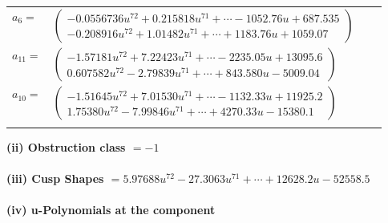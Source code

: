 \documentclass[1p]{elsarticle_modified}
\theoremstyle{definition}
\begin{document}
\begin{tabular}{m{7pt} m{180pt} m{7pt} m{180pt} }
\flushright $a_{6}=$&$\begin{pmatrix}-0.0556736 u^{72}+0.215818 u^{71}+\cdots-1052.76 u+687.535\\-0.208916 u^{72}+1.01482 u^{71}+\cdots+1183.76 u+1059.07\end{pmatrix}$ \\
\flushright $a_{11}=$&$\begin{pmatrix}-1.57181 u^{72}+7.22423 u^{71}+\cdots-2235.05 u+13095.6\\0.607582 u^{72}-2.79839 u^{71}+\cdots+843.580 u-5009.04\end{pmatrix}$ \\
\flushright $a_{10}=$&$\begin{pmatrix}-1.51645 u^{72}+7.01530 u^{71}+\cdots-1132.33 u+11925.2\\1.75380 u^{72}-7.99846 u^{71}+\cdots+4270.33 u-15380.1\end{pmatrix}$\\&\end{tabular}
\flushleft \textbf{(ii) Obstruction class $= -1$}\\~\\
\flushleft \textbf{(iii) Cusp Shapes $= 5.97688 u^{72}-27.3063 u^{71}+\cdots+12628.2 u-52558.5$}\\~\\
\newpage\renewcommand{\arraystretch}{1}
\flushleft \textbf{(iv) u-Polynomials at the component}\newline \\
\end{document}
